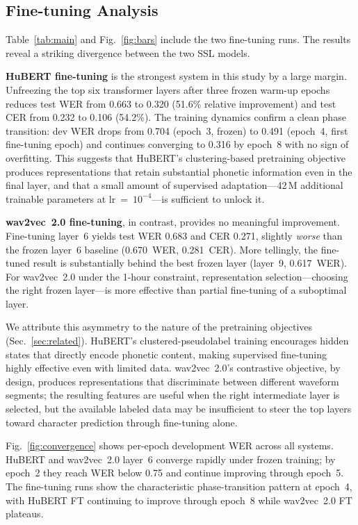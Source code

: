 \documentclass{article}
\begin{document}
\subsection{Fine-tuning Analysis}
\label{sec:finetune}

Table~\ref{tab:main} and Fig.~\ref{fig:bars} include the two fine-tuning runs.
The results reveal a striking divergence between the two SSL models.

\textbf{HuBERT fine-tuning} is the strongest system in this study by a large
margin. Unfreezing the top six transformer layers after three frozen warm-up
epochs reduces test WER from 0.663 to 0.320 (51.6\% relative improvement) and
test CER from 0.232 to 0.106 (54.2\%). The training dynamics confirm a clean
phase transition: dev WER drops from 0.704 (epoch~3, frozen) to 0.491
(epoch~4, first fine-tuning epoch) and continues converging to 0.316 by
epoch~8 with no sign of overfitting. This suggests that HuBERT's clustering-based
pretraining objective produces representations that retain substantial
phonetic information even in the final layer, and that a small amount of
supervised adaptation---42\,M additional trainable parameters at
lr~=~$10^{-4}$---is sufficient to unlock it.

\textbf{wav2vec~2.0 fine-tuning}, in contrast, provides no meaningful
improvement. Fine-tuning layer~6 yields test WER 0.683 and CER 0.271, slightly
\textit{worse} than the frozen layer~6 baseline (0.670~WER, 0.281~CER). More
tellingly, the fine-tuned result is substantially behind the best frozen layer
(layer~9, 0.617~WER). For wav2vec~2.0 under the 1-hour constraint,
representation selection---choosing the right frozen layer---is more effective
than partial fine-tuning of a suboptimal layer.

We attribute this asymmetry to the nature of the pretraining objectives
(Sec.~\ref{sec:related}). HuBERT's clustered-pseudolabel training encourages
hidden states that directly encode phonetic content, making supervised
fine-tuning highly effective even with limited data. wav2vec~2.0's contrastive
objective, by design, produces representations that discriminate between
different waveform segments; the resulting features are useful when the
right intermediate layer is selected, but the available labeled data may be
insufficient to steer the top layers toward character prediction through
fine-tuning alone.

Fig.~\ref{fig:convergence} shows per-epoch development WER across all systems.
HuBERT and wav2vec~2.0 layer~6 converge rapidly under frozen training; by
epoch~2 they reach WER below 0.75 and continue improving through epoch~5.
The fine-tuning runs show the characteristic phase-transition pattern at
epoch~4, with HuBERT FT continuing to improve through epoch~8 while
wav2vec~2.0 FT plateaus.
\end{document}
